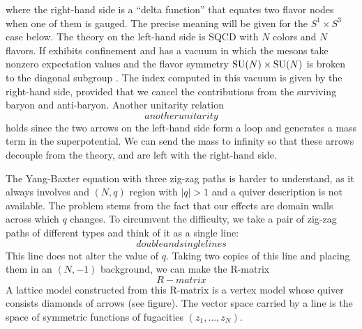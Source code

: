  where the right-hand side is a ``delta function'' that equates
two flavor nodes when one of them is gauged. The precise meaning will
be given for the $S^{1}\times S^{3}$ case below. The theory on the
left-hand side is SQCD with $N$ colors and $N$ flavors. If exhibits
confinement and has a vacuum in which the mesons take nonzero expectation
values and the flavor symmetry $\mathrm{SU}(N)\times \mathrm{SU}(N)$ is broken to the
diagonal subgroup \cite{Seiberg:1994bz}. The index computed in this vacuum
is given by the right-hand side, provided that we cancel the contributions
from the surviving baryon and anti-baryon. Another unitarity relation
\begin{equation}
anotherunitarity
\end{equation}
 holds since the two arrows on the left-hand side form a loop and
generates a mass term in the superpotential. We can send the mass
to infinity so that these arrows decouple from the theory, and are
left with the right-hand side. 

The Yang-Baxter equation with three zig-zag paths is harder to understand,
as it always involves and $\left( N,q \right)$ region with $\left| q \right|>1$
and a quiver description is not available. The problem stems from
the fact that our effects are domain walls across which $q$ changes.
To circumvent the difficulty, we take a pair of zig-zag paths of different
types and think of it as a single line:
\begin{equation}
doubleandsinglelines
\end{equation}
 This line does not alter the value of $q$. Taking two copies of
this line and placing them in an $\left( N,-1 \right)$ background,
we can make the R-matrix
\begin{equation}
R-matrix  \label{eq:R_N-1}
\end{equation}
 A lattice model constructed from this R-matrix is a vertex model
whose quiver consists diamonds of arrows (see figure). The vector
space carried by a line is the space of symmetric functions of fugacities
$(z_{1},\ldots,z_{N})$. 

